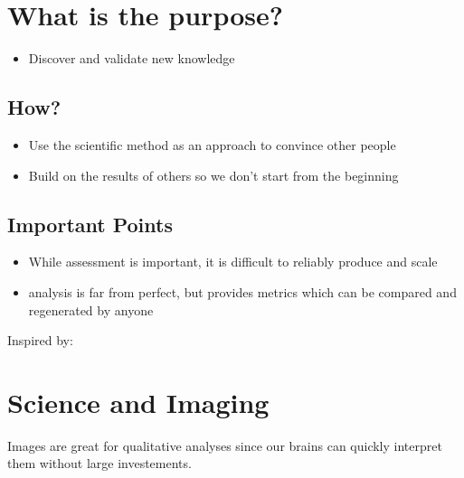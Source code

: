\documentclass[letterpaper,10pt,english]{sphinxmanual}
\begin{document}
\section{What is the purpose?}
\label{\detokenize{01-Introduction:what-is-the-purpose}}\begin{itemize}
\item {} 
\sphinxAtStartPar
Discover and validate new knowledge

\end{itemize}


\subsection{How?}
\label{\detokenize{01-Introduction:how}}\begin{itemize}
\item {} 
\sphinxAtStartPar
Use the scientific method as an approach to convince other people

\item {} 
\sphinxAtStartPar
Build on the results of others so we don’t start from the beginning

\end{itemize}


\subsection{Important Points}
\label{\detokenize{01-Introduction:important-points}}\begin{itemize}
\item {} 
\sphinxAtStartPar
While  assessment is important, it is difficult to reliably produce and scale

\item {} 
\sphinxAtStartPar
{} analysis is far from perfect, but provides metrics which can be compared and regenerated by anyone

\end{itemize}

\sphinxAtStartPar
Inspired by: 


\section{Science and Imaging}
\label{\detokenize{01-Introduction:science-and-imaging}}
\sphinxAtStartPar
Images are great for qualitative analyses since our brains can quickly interpret them without large  investements.
\end{document}
